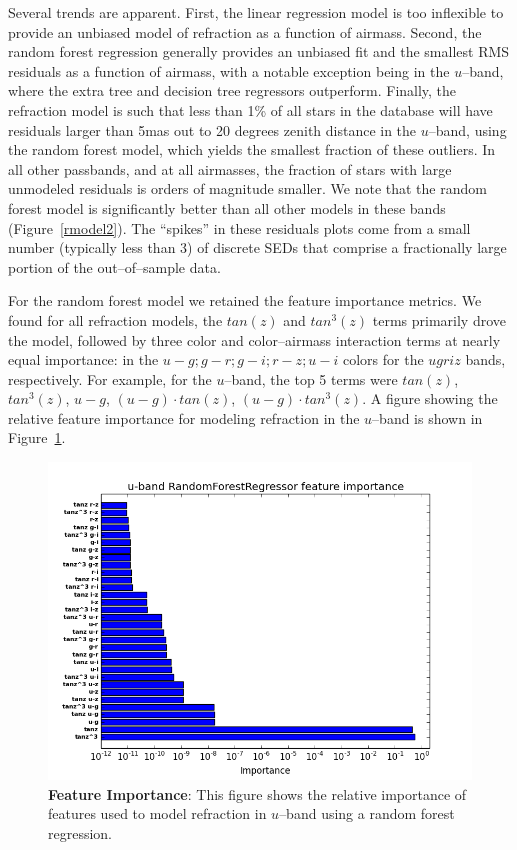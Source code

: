 \documentclass[DM,toc]{lsstdoc}
\begin{document}
Several trends are apparent.  First, the linear regression model is
too inflexible to provide an unbiased model of refraction as a
function of airmass.  Second, the random forest regression generally
provides an unbiased fit and the smallest RMS residuals as a function
of airmass, with a notable exception being in the $u$--band, where the
extra tree and decision tree regressors outperform.  Finally, the
refraction model is such that less than 1\% of all stars in the
database will have residuals larger than 5mas out to 20 degrees zenith
distance in the $u$--band, using the random forest model, which yields
the smallest fraction of these outliers.  In all other passbands, and
at all airmasses, the fraction of stars with large unmodeled residuals
is orders of magnitude smaller.  We note that the random forest model
is significantly better than all other models in these bands
(Figure~\ref{rmodel2}).  The ``spikes'' in these residuals plots come
from a small number (typically less than 3) of discrete SEDs that
comprise a fractionally large portion of the out--of--sample data.

For the random forest model we retained the feature importance
metrics.  We found for all refraction models, the $tan(z)$ and
$tan^3(z)$ terms primarily drove the model, followed by three color
and color--airmass interaction terms at nearly equal importance: in
the $u-g; g-r; g-i; r-z; u-i$ colors for the $ugriz$ bands,
respectively.  For example, for the $u$--band, the top 5 terms were
$tan(z)$, $tan^3(z)$, $u-g$, $(u-g) \cdot tan(z)$, $(u-g) \cdot
tan^3(z)$.  A figure showing the relative feature importance for
modeling refraction in the $u$--band is shown in
Figure~\ref{fig:feat}.

\begin{figure}[!t]
  \centering
  \includegraphics[width=1.1\textwidth]{R_u_A_50_rfr.png}
  \caption{{\bf Feature Importance}: This figure shows the relative
    importance of features used to model refraction in $u$--band using
    a random forest regression.}
  \label{fig:feat}
\end{figure}
\end{document}
